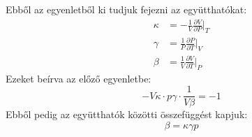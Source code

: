 \documentclass[a4paper,12pt]{article}
\begin{document}
Ebből az egyenletből ki tudjuk fejezni az együtthatókat:
\begin{equation}
    \begin{aligned}
        \kappa &= -\frac{1}{V} \frac{\partial V}{\partial P}\bigg|_{T} \\
        \gamma &= \frac{1}{P} \frac{\partial P}{\partial T}\bigg|_{V} \\
        \beta &= \frac{1}{V} \frac{\partial V}{\partial T}\bigg|_{P}
    \end{aligned}
\end{equation}
Ezeket beírva az előző egyenletbe:
\begin{equation}
    -V\kappa \cdot p\gamma \cdot \frac{1}{V\beta} = -1
\end{equation}
Ebből pedig az együtthatók közötti összefüggést kapjuk:
\begin{equation}
   \beta = \kappa \gamma p
\end{equation}
\end{document}
